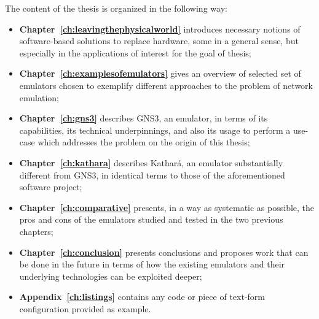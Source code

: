 The content of the thesis is organized in the following way:
\begin{itemize}
  \item \textbf{Chapter~\ref{ch:leavingthephysicalworld}} introduces necessary notions of software-based solutions to replace hardware, some in a general sense, but especially in the applications of interest for the goal of thesis;
  \item \textbf{Chapter~\ref{ch:examplesofemulators}} gives an overview of selected set of emulators chosen to exemplify different approaches to the problem of network emulation;
  \item \textbf{Chapter~\ref{ch:gns3}} describes GNS3, an emulator, in terms of its capabilities, its technical underpinnings, and also its usage to perform a use-case which addresses the problem on the origin of this thesis;
  \item \textbf{Chapter~\ref{ch:kathara}} describes Kathará, an emulator substantially different from GNS3, in identical terms to those of the aforementioned software project;
  \item \textbf{Chapter~\ref{ch:comparative}} presents, in a way as systematic as possible, the pros and cons of the emulators studied and tested in the two previous chapters;
  \item \textbf{Chapter~\ref{ch:conclusion}} presents conclusions and proposes work that can be done in the future in terms of how the existing emulators and their underlying technologies can be exploited deeper;
  \item \textbf{Appendix~\ref{ch:listings}} contains any code or piece of text-form configuration provided as example.
\end{itemize}

